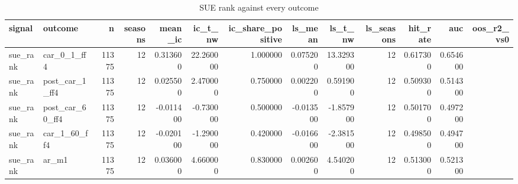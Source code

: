 \begin{table}
\caption{SUE rank against every outcome}
\label{tab:t7_surprise_benchmark__validation}
\begin{tabular}{llrrrrrrrrrrr}
\toprule
signal & outcome & n & seasons & mean\_ic & ic\_t\_nw & ic\_share\_positive & ls\_mean & ls\_t\_nw & ls\_seasons & hit\_rate & auc & oos\_r2\_vs0 \\
\midrule
sue\_rank & car\_0\_1\_ff4 & 11375 & 12 & 0.313600 & 22.260000 & 1.000000 & 0.075200 & 13.329300 & 12 & 0.617300 & 0.654600 &  \\
sue\_rank & post\_car\_1\_ff4 & 11375 & 12 & 0.025500 & 2.470000 & 0.750000 & 0.002200 & 0.591900 & 12 & 0.509300 & 0.514300 &  \\
sue\_rank & post\_car\_60\_ff4 & 11375 & 12 & -0.011400 & -0.730000 & 0.500000 & -0.013500 & -1.857900 & 12 & 0.501700 & 0.497200 &  \\
sue\_rank & car\_1\_60\_ff4 & 11375 & 12 & -0.020100 & -1.290000 & 0.420000 & -0.016600 & -2.381500 & 12 & 0.498500 & 0.494700 &  \\
sue\_rank & ar\_m1 & 11375 & 12 & 0.036000 & 4.660000 & 0.830000 & 0.002600 & 4.540200 & 12 & 0.513000 & 0.521300 &  \\
\bottomrule
\end{tabular}
\end{table}

